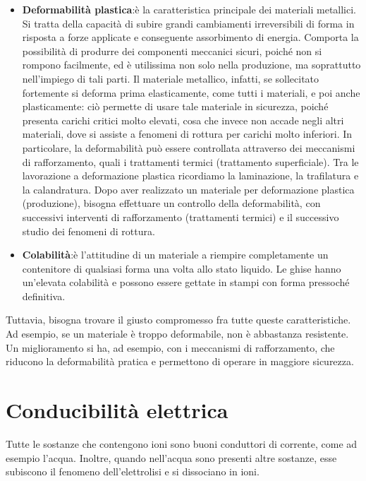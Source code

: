 \begin{itemize}
    \item \textbf{Deformabilità plastica}:è la caratteristica principale dei materiali metallici. Si tratta della capacità di subire grandi cambiamenti irreversibili di forma in risposta a forze applicate e conseguente assorbimento di energia. Comporta la possibilità di produrre dei componenti meccanici sicuri, poiché non si rompono facilmente, ed è utilissima non solo nella produzione, ma soprattutto nell’impiego di tali parti. Il materiale metallico, infatti, se sollecitato fortemente si deforma prima elasticamente, come tutti i materiali, e poi anche plasticamente: ciò permette di usare tale materiale in sicurezza, poiché presenta carichi critici molto elevati, cosa che invece non accade negli altri materiali, dove si assiste a fenomeni di rottura per carichi molto inferiori. In particolare, la deformabilità può essere controllata attraverso dei meccanismi di rafforzamento, quali i trattamenti termici (trattamento superficiale). Tra le lavorazione a deformazione plastica ricordiamo la laminazione, la trafilatura e la calandratura. Dopo aver realizzato un materiale per deformazione plastica (produzione), bisogna effettuare un controllo della deformabilità, con successivi interventi di rafforzamento (trattamenti termici) e il successivo studio dei fenomeni di rottura.
    \item \textbf{Colabilità}:è l'attitudine di un materiale a riempire completamente un contenitore di qualsiasi forma una volta allo stato liquido. Le ghise hanno un’elevata colabilità e possono essere gettate in stampi con forma pressoché definitiva.

\end{itemize}

Tuttavia, bisogna trovare il giusto compromesso fra tutte queste caratteristiche. Ad esempio, se un materiale è troppo deformabile, non è abbastanza resistente. Un miglioramento si ha, ad esempio, con i meccanismi di rafforzamento, che riducono la deformabilità pratica e permettono di operare in maggiore sicurezza.

\section{Conducibilità elettrica}\label{PropElettriche} 

Tutte le sostanze che contengono ioni sono buoni conduttori di corrente, come ad esempio l'acqua. Inoltre, quando nell'acqua sono presenti altre sostanze, esse subiscono il fenomeno dell'elettrolisi e si dissociano in ioni.


